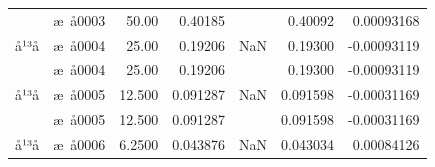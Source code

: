 \documentclass[UTF8,10pt,a4paper,fontset=fandol]{ctexart}
\newcommand{\fieldvalue}[1]{#1}
\begin{document}
\begin{tabularx}{\textwidth}{l l r r r r r}
&
\fieldvalue{æ å0003} &
\fieldvalue{50.00} &
\fieldvalue{0.40185} & &
\fieldvalue{0.40092} &
\fieldvalue{0.00093168} \\

å¹³å &
\fieldvalue{æ å0004} &
\fieldvalue{25.00} &
\fieldvalue{0.19206} &
\fieldvalue{NaN} &
\fieldvalue{0.19300} &
\fieldvalue{-0.00093119} \\

&
\fieldvalue{æ å0004} &
\fieldvalue{25.00} &
\fieldvalue{0.19206} & &
\fieldvalue{0.19300} &
\fieldvalue{-0.00093119} \\

å¹³å &
\fieldvalue{æ å0005} &
\fieldvalue{12.500} &
\fieldvalue{0.091287} &
\fieldvalue{NaN} &
\fieldvalue{0.091598} &
\fieldvalue{-0.00031169} \\

&
\fieldvalue{æ å0005} &
\fieldvalue{12.500} &
\fieldvalue{0.091287} & &
\fieldvalue{0.091598} &
\fieldvalue{-0.00031169} \\

å¹³å &
\fieldvalue{æ å0006} &
\fieldvalue{6.2500} &
\fieldvalue{0.043876} &
\fieldvalue{NaN} &
\fieldvalue{0.043034} &
\fieldvalue{0.00084126} \\


\end{tabularx}
\end{document}
